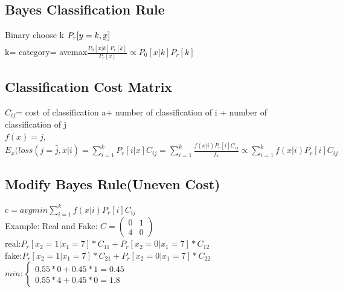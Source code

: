 \documentclass{article}
\begin{document}
\subsection{Bayes Classification Rule} 	
Binary choose k $P_r[y=k, \uwave{x}]$
\\k= category= avemax$\frac{P_0[x|k]P_r[k]}{P_r[x]} \propto P_0[x|k]P_r[k]$

\subsection{Classification Cost Matrix} 
$C_{ij}$= cost of classification a+ number of classification of i + number of classification of j
\\$f(x)=j$, $E_x(loss(j=\hat{j},x|i)= \sum_{i=1}^{k}P_r[i|x]C_{ij}= \sum_{i=1}^{k}\frac{f(x|i)P_r[i]C_{ij}}{f_x} \propto \sum_{i=1}^{k}f(x|i)P_r[i]C_{ij}$

\subsection{Modify Bayes Rule(Uneven Cost)} 
$c= avgmin\sum_{i=1}^{k}f(x|i)P_r[i]C_{ij}$
\\Example: Real and Fake: $C=\begin{pmatrix} 0 & 1 \\ 4 & 0 \end{pmatrix}$
\\real:$P_r[x_2=1|x_1=7]*C_{11}+P_r[x_2=0|x_1=7]*C_{12}$
\\fake:$P_r[x_2=1|x_1=7]*C_{21}+P_r[x_2=0|x_1=7]*C_{22}$
\\$min:\begin{cases} 0.55*0+0.45*1=0.45 \\ 
	0.55*4+0.45*0=1.8 \end{cases}$
\end{document}
